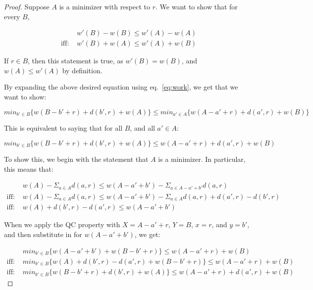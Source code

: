 \begin{proof}
    Suppose $A$ is a minimizer with respect to $r$. We want to show that for every $B$,

    \begin{equation*}
        \begin{split}
            &w'(B) - w(B) \leq w'(A) - w(A) \\
            \text{iff: }&w'(B) + w(A) \leq w'(A) + w(B)
        \end{split}
    \end{equation*}

    If $r \in B$, then this statement is true, as $w'(B) = w(B)$, and $w(A) \leq w'(A)$ by definition.

    By expanding the above desired equation using eq.~\ref{eq:work}, we get that we want to show:

    \begin{equation*}
        min_{b' \in B} \{ w(B - b' + r) + d(b', r) + w(A)\} \leq min_{a' \in A} \{ w(A - a' + r) + d(a', r) + w(B)\}
    \end{equation*}

    This is equivalent to saying that for all $B$, and all $a' \in A$: 

    \begin{equation*}
        min_{b' \in B} \{ w(B - b' + r) + d(b', r) + w(A)\} \leq w(A - a' + r) + d(a', r) + w(B)
    \end{equation*}

    To show this, we begin with the statement that $A$ is a minimizer. In particular, this means that:

    \begin{equation*}
        \begin{split}
            &w(A) - \Sigma_{a \in A} d(a,r) \leq w(A -a' + b') - \Sigma_{a \in A - a' + b'} d(a,r) \\
            \text{iff: }&w(A) - \Sigma_{a \in A} d(a,r) \leq w(A -a' + b') - \Sigma_{a \in A} d(a,r) + d(a', r) - d(b', r) \\
            \text{iff: }&w(A) + d(b', r) - d(a', r) \leq w(A - a' + b')
        \end{split}
    \end{equation*}

    When we apply the QC property with $X = A - a' + r$, $Y = B$, $x = r$, and $y = b'$, and then substitute in for $w(A - a' + b')$, we get:

    \begin{equation*}
        \begin{split}
            &min_{b' \in B} \{ w(A - a' + b') + w(B - b' + r)\} \leq w(A - a' + r) + w(B) \\
            \text{iff: }&min_{b' \in B} \{ w(A) + d(b', r) - d(a', r) + w(B - b' + r)\}\leq w(A - a' + r) + w(B) \\
            \text{iff: }&min_{b' \in B} \{ w(B - b' + r) + d(b', r) + w(A)\} \leq w(A - a' + r) + d(a', r) + w(B)
        \end{split}
    \end{equation*}
\end{proof}

